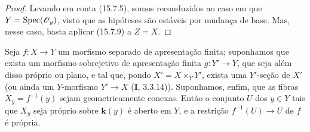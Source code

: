\begin{proof}
Levando em conta (15.7.5), somos reconduzidos ao caso em que $Y=\operatorname{Spec}(\mathscr{O}_y)$, visto que as hipóteses são estáveis por mudança de base. Mas, nesse caso, basta aplicar (15.7.9) a $Z=X$.
\end{proof}

\begin{corollary}[15.7.11]
\label{IV.15.7.11}
Seja $f:X\to Y$ um morfismo separado de apresentação finita; suponhamos que exista um morfismo sobrejetivo de apresentação finita $g:Y'\to Y$, que seja além disso próprio ou plano, e tal que, pondo $X'=X\times_Y Y'$, exista uma $Y'$-seção de $X'$ (ou ainda um $Y$-morfismo $Y'\to X$ (\textbf{I}, 3.3.14)). Suponhamos, enfim, que as fibras $X_y=f^{-1}(y)$ sejam geometricamente conexas. Então o conjunto $U$ dos $y\in Y$ tais que $X_y$ seja próprio sobre $\mathbf k(y)$ é aberto em $Y$, e a restrição $f^{-1}(U)\to U$ de $f$ é própria.
\end{corollary}

